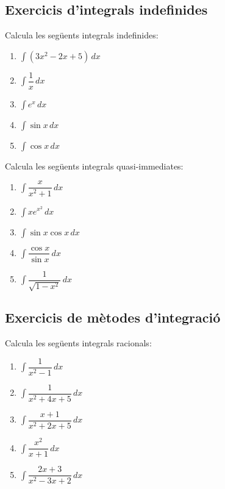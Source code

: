 \documentclass[12pt]{article}
\begin{document}
\subsection{Exercicis d'integrals indefinides}

\begin{exercici}
Calcula les següents integrals indefinides:
\begin{enumerate}
    \item $\displaystyle \int (3x^2 - 2x + 5)\,dx$
    \item $\displaystyle \int \dfrac{1}{x}\,dx$
    \item $\displaystyle \int e^x\,dx$
    \item $\displaystyle \int \sin x\,dx$
    \item $\displaystyle \int \cos x\,dx$
\end{enumerate}
\end{exercici}

\begin{exercici}
Calcula les següents integrals quasi-immediates:
\begin{enumerate}
    \item $\displaystyle \int \dfrac{x}{x^2+1}\,dx$
    \item $\displaystyle \int x e^{x^2}\,dx$
    \item $\displaystyle \int \sin x \cos x\,dx$
    \item $\displaystyle \int \dfrac{\cos x}{\sin x}\,dx$
    \item $\displaystyle \int \dfrac{1}{\sqrt{1-x^2}}\,dx$
\end{enumerate}
\end{exercici}

\subsection{Exercicis de mètodes d'integració}

\begin{exercici}
Calcula les següents integrals racionals:
\begin{enumerate}
    \item $\displaystyle \int \dfrac{1}{x^2-1}\,dx$
    \item $\displaystyle \int \dfrac{1}{x^2+4x+5}\,dx$
    \item $\displaystyle \int \dfrac{x+1}{x^2+2x+5}\,dx$
    \item $\displaystyle \int \dfrac{x^2}{x+1}\,dx$
    \item $\displaystyle \int \dfrac{2x+3}{x^2-3x+2}\,dx$
\end{enumerate}
\end{exercici}
\end{document}
